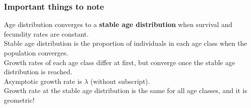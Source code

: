 \documentclass[color=usenames,dvipsnames]{beamer}\usepackage[]{graphicx}\usepackage[]{xcolor}
\begin{document}
\begin{frame}
  \frametitle{Important things to note}
  \large
  Age distribution converges to a {\bf stable age
    distribution} when survival and fecundity rates are constant. \\
  \pause
  \vfill
  Stable age distribution is the proportion of individuals in each age
  class when the population converges. \\
  \pause
  \vfill
  Growth rates of each age class differ at first, but converge
  once the stable age distribution is reached. \\
  \pause
  \vfill
  Asymptotic growth rate is $\lambda$ (without subscript). \\
  \pause
  \vfill
  Growth rate at the stable age distribution is the same for
  all age classes, and it is geometric! \\
\end{frame}







%




\end{document}
